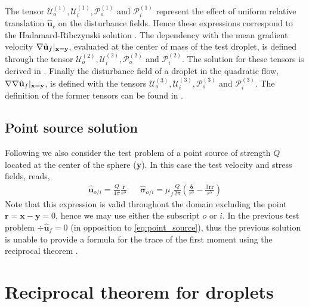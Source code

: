 The tensor $\mathcal{U}_{o}^{(1)},\mathcal{U}_{i}^{(1)},\mathcal{P}_{o}^{(1)}$  and $\mathcal{P}_{i}^{(1)}$ represent the effect of uniform relative translation $\hat{\textbf{u}}_r$ on the disturbance fields.
Hence these expressions correspond to the Hadamard-Ribczynski solution \citep{pozrikidis1992boundary,kim2013microhydrodynamics}. 
The dependency with the mean gradient velocity $\mathbf{\nabla} \hat{\textbf{u}}_f|_{\textbf{x}=\textbf{y}}$, evaluated at the center of mass of the test droplet, is defined through the tensor $\mathcal{U}_{o}^{(2)},\mathcal{U}_{i}^{(2)},\mathcal{P}_{o}^{(2)}$ and $\mathcal{P}_{i}^{(2)}$.
The solution for these tensors is derived in \citet{rallison1978note,leal2007advanced,raja2010inertial}. 
Finally the disturbance field of a droplet in the quadratic flow, $\mathbf{\nabla}\mathbf{\nabla} \hat{\textbf{u}}_f|_{\textbf{x}=\textbf{y}}$, is defined with the tensors $\mathcal{U}_{o}^{(3)},\mathcal{U}_{i}^{(3)},\mathcal{P}_{o}^{(3)}$ and $\mathcal{P}_{i}^{(3)}$.
The definition of the former tensors can be found in \citet{nadim1991motion}.


\subsection{Point source solution}



Following \citet{stone2001inertial} we also consider the test problem of a point source of strength $Q$ located at the center of the sphere (\textbf{y}).
In this case the test velocity  and stress fields, reads\citep{pozrikidis2011introduction,pozrikidis1992boundary}, 
\begin{align}
    \hat{\textbf{u}}_{o/i} = \frac{Q}{4\pi} \frac{\textbf{r}}{r^3}
    && \hat{\bm\sigma}_{o/i} = \mu_f \frac{Q}{2\pi}\left(
        \frac{\bm\delta}{r^3}
        - \frac{3 \textbf{rr}}{r^5}
    \right)
    \label{eq:point_source}
\end{align}
Note that this expression is valid throughout the domain excluding the point $\textbf{r} =  \textbf{x} -  \textbf{y} = 0$, hence we may use either the subscript $o$ or $i$. 
In the previous test problem $\div \hat{\textbf{u}}_f= 0$ (in opposition to \ref{eq:point_source}), thus the previous solution is unable to provide a formula for the trace of the first moment using the reciprocal theorem \citep{stone2001inertial}.



\section{Reciprocal theorem for droplets}

